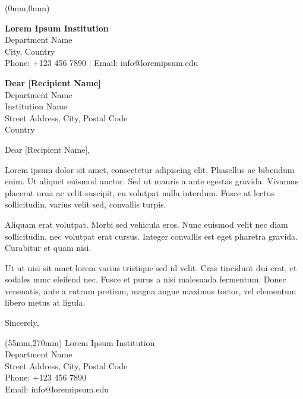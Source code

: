 \documentclass[a4paper,11pt]{letter}
\date{}
\begin{document}
	
	\begin{textblock*}{210mm}(0mm,0mm) %
		\raggedright
		\Huge \textbf{Lorem Ipsum Institution} \\
		\LARGE Department Name \\
		\large City, Country \\
		\normalsize Phone: +123 456 7890 | Email: info@loremipsum.edu
	\end{textblock*}
	
	\begin{letter}{
			\textbf{Dear [Recipient Name]} \\
			Department Name \\
			Institution Name \\
			Street Address, City, Postal Code \\
			Country
		}
		
		\opening{Dear [Recipient Name],}
		
		Lorem ipsum dolor sit amet, consectetur adipiscing elit. Phasellus ac bibendum enim. Ut aliquet euismod auctor. Sed ut mauris a ante egestas gravida. Vivamus placerat urna ac velit suscipit, eu volutpat nulla interdum. Fusce at lectus sollicitudin, varius velit sed, convallis turpis.
		
		Aliquam erat volutpat. Morbi sed vehicula eros. Nunc euismod velit nec diam sollicitudin, nec volutpat erat cursus. Integer convallis est eget pharetra gravida. Curabitur et quam nisi.
		
		Ut ut nisi sit amet lorem varius tristique sed id velit. Cras tincidunt dui erat, et sodales nunc eleifend nec. Fusce et purus a nisi malesuada fermentum. Donec venenatis, ante a rutrum pretium, magna augue maximus tortor, vel elementum libero metus at ligula.
		
		\closing{Sincerely,}
		
		\begin{textblock*}{150mm}(55mm,270mm) %
			\raggedleft %
			\textcolor{burgundy}{Lorem Ipsum Institution} \\
			Department Name \\
			Street Address, City, Postal Code \\
			Phone: +123 456 7890 \\
			Email: info@loremipsum.edu
		\end{textblock*}
		

\end{letter}
\end{document}
